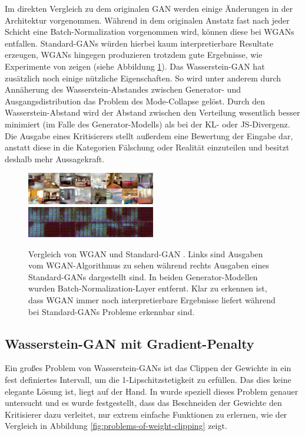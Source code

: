 Im direkten Vergleich zu dem originalen GAN \cite{goodfellow2014generative}
werden einige Änderungen in der Architektur vorgenommen. Während in dem
originalen Anstatz fast nach jeder Schicht eine Batch-Normalization
vorgenommen wird, können diese bei WGANs entfallen. Standard-GANs würden
hierbei kaum interpretierbare Resultate erzeugen, WGANs hingegen produzieren
trotzdem gute Ergebnisse, wie Experimente von \cite{arjovsky2017wasserstein}
zeigen (siehe Abbildung \ref{fig:wgan-gan-no-batchnorm}). Das Wasserstein-GAN
hat zusätzlich noch einige nützliche Eigenschaften. So wird unter anderem
durch Annäherung des Wasserstein-Abstandes zwischen Generator- und
Ausgangsdistribution das Problem des Mode-Collapse gelöst.  Durch den
Wasserstein-Abstand wird der Abstand zwischen den Verteilung wesentlich besser
minimiert (im Falle des Generator-Modells) als bei der KL- oder JS-Divergenz.
Die Ausgabe eines Kritisierers stellt außerdem eine Bewertung der Eingabe dar,
anstatt diese in die Kategorien Fälschung oder Realität einzuteilen und besitzt
deshalb mehr Aussagekraft.

\begin{figure}
\includegraphics[width=0.5\textwidth]{images/image-022.png}
\includegraphics[width=0.5\textwidth]{images/image-024.png}
\caption{Vergleich von WGAN und Standard-GAN \cite{arjovsky2017wasserstein}.
    Links sind Ausgaben vom WGAN-Algorithmus zu sehen während rechts Ausgaben
    eines Standard-GANs dargestellt sind. In beiden Generator-Modellen wurden
    Batch-Normalization-Layer entfernt. Klar zu erkennen ist, dass WGAN immer
    noch interpretierbare Ergebnisse liefert während bei Standard-GANs Probleme
    erkennbar sind.}
\label{fig:wgan-gan-no-batchnorm}
\end{figure}

\subsection{Wasserstein-GAN mit Gradient-Penalty}
Ein großes Problem von Wasserstein-GANs ist das Clippen der Gewichte in ein
fest definiertes Intervall, um die 1-Lipschitzstetigkeit zu erfüllen. Das dies
keine elegante Lösung ist, liegt auf der Hand. In \cite{gulrajani2017improved}
wurde speziell dieses Problem genauer untersucht und es wurde festgestellt,
dass das Beschneiden der Gewichte den Kritisierer dazu verleitet, nur extrem
einfache Funktionen zu erlernen, wie der Vergleich in Abbildung
\ref{fig:problems-of-weight-clipping} zeigt. 


